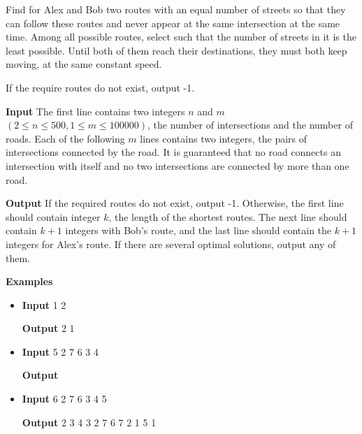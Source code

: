 \normalfont\documentclass[letterpaper,11pt]{article}
\begin{document}
Find for Alex and Bob two routes with an equal number of streets so that they can follow these routes and never appear at the same intersection at the same time. Among all possible routes, select such that the number of streets in it is the least possible. Until both of them reach their destinations, they must both keep moving, at the same constant speed.

If the require routes do not exist, output -1.

\textbf{Input} \newline
The first line contains two integers $n$ and $m$ $(2 \leq n \leq 500, 1 \leq m \leq 100000)$, the number of intersections and the number of roads. Each of the following $m$ lines contains two integers, the pairs of intersections connected by the road. It is guaranteed that no road connects an intersection with itself and no two intersections are connected by more than one road.

\textbf{Output} \newline
If the required routes do not exist, output -1. Otherwise, the first line should contain integer $k$, the length of the shortest routes. The next line should contain $k + 1$ integers with Bob's route, and the last line should contain the $k + 1$ integers for Alex's route. If there are several optimal solutions, output any of them.

\textbf{Examples}
\begin{itemize}
\item \textbf{Input}  1  2

\textbf{Output}   2  1

\item \textbf{Input}  5  2  7  6  3  4

\textbf{Output} 

\item \textbf{Input}  6  2  7  6  3  4  5

\textbf{Output}   2 3 4 3 2 7  6 7 2 1 5 1
\end{itemize}
\end{document}
